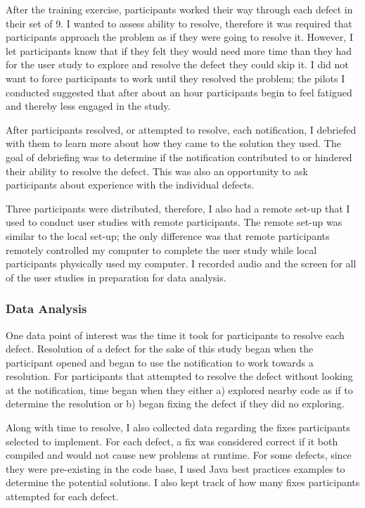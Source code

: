 After the training exercise, participants worked their way through each defect in their set of 9. I wanted to assess ability to resolve, therefore it was required that participants approach the problem as if they were going to resolve it. However, I let participants know that if they felt they would need more time than they had for the user study to explore and resolve the defect they could skip it. I did not want to force participants to work until they resolved the problem; the pilots I conducted suggested that after about an hour participants begin to feel fatigued and thereby less engaged in the study.

After participants resolved, or attempted to resolve, each notification, I debriefed with them to learn more about how they came to the solution they used. The goal of debriefing was to determine if the notification contributed to or hindered their ability to resolve the defect. This was also an opportunity to ask participants about experience with the individual defects. 

Three participants were distributed, therefore, I also had a remote set-up that I used to conduct user studies with remote participants. The remote set-up was similar to the local set-up; the only difference was that remote participants remotely controlled my computer to complete the user study while local participants physically used my computer. I recorded audio and the screen for all of the user studies in preparation for data analysis.


\subsubsection{Data Analysis}

One data point of interest was the time it took for participants to resolve each defect. 
Resolution of a defect for the sake of this study began when the participant opened and began to use the notification to work towards a resolution. For participants that attempted to resolve the defect without looking at the notification, time began when they either a) explored nearby code as if to determine the resolution or b) began fixing the defect if they did no exploring.

Along with time to resolve, I also collected data regarding the fixes participants selected to implement. For each defect, a fix was considered correct if it both compiled and would not cause new problems at runtime. For some defects, since they were pre-existing in the code base, I used Java best practices examples to determine the potential solutions. I also kept track of how many fixes participants attempted for each defect.


